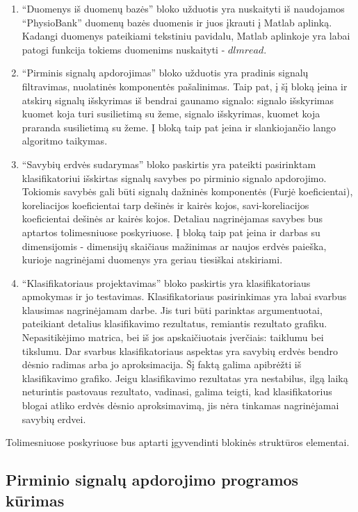 \documentclass[]{vgtuef}
\begin{document}
\begin{enumerate}
\item ``Duomenys iš duomenų bazės'' bloko užduotis yra nuskaityti iš naudojamos ``PhysioBank'' duomenų bazės duomenis ir juos įkrauti į Matlab aplinką. Kadangi duomenys pateikiami tekstiniu pavidalu, Matlab aplinkoje yra labai patogi funkcija tokiems duomenims nuskaityti - $dlmread$.

\item ``Pirminis signalų apdorojimas'' bloko užduotis yra pradinis signalų filtravimas, nuolatinės komponentės pašalinimas. Taip pat, į šį bloką įeina ir atskirų signalų išskyrimas iš bendrai gaunamo signalo: signalo išskyrimas kuomet koja turi susilietimą su žeme, signalo išskyrimas, kuomet koja praranda susilietimą su žeme. Į bloką taip pat įeina ir slankiojančio lango algoritmo taikymas.
\item ``Savybių erdvės sudarymas'' bloko paskirtis yra pateikti pasirinktam klasifikatoriui išskirtas signalų savybes po pirminio signalo apdorojimo. Tokiomis savybės gali būti signalų dažninės komponentės (Furjė koeficientai), koreliacijos koeficientai tarp dešinės ir kairės kojos, savi-koreliacijos koeficientai dešinės ar kairės kojos. Detaliau nagrinėjamas savybes bus aptartos tolimesniuose poskyriuose. Į bloką taip pat įeina ir darbas su dimensijomis - dimensijų skaičiaus mažinimas ar naujos erdvės paieška, kurioje nagrinėjami duomenys yra geriau tiesiškai atskiriami.

\item ``Klasifikatoriaus projektavimas'' bloko paskirtis yra klasifikatoriaus apmokymas ir jo testavimas. Klasifikatoriaus pasirinkimas yra labai svarbus klausimas nagrinėjamam darbe. Jis turi būti parinktas argumentuotai, pateikiant detalius klasifikavimo rezultatus, remiantis rezultato grafiku. Nepasitikėjimo matrica, bei iš jos apskaičiuotais įverčiais: taiklumu bei tikslumu. Dar svarbus klasifikatoriaus aspektas yra savybių erdvės bendro dėsnio radimas arba jo aproksimacija. Šį faktą galima apibrėžti iš klasifikavimo grafiko. Jeigu klasifikavimo rezultatas yra nestabilus, ilgą laiką neturintis pastovaus rezultato, vadinasi, galima teigti, kad klasifikatorius blogai atliko erdvės dėsnio aproksimavimą, jis nėra tinkamas nagrinėjamai savybių erdvei.
\end{enumerate}

Tolimesniuose poskyriuose bus aptarti įgyvendinti blokinės struktūros elementai.

\subsection{Pirminio signalų apdorojimo programos kūrimas}
\end{document}
